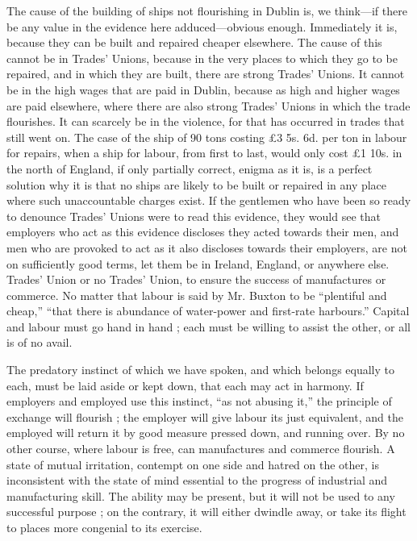 The cause of the building of ships not flourishing in Dublin is, we
think---if there be any value in the evidence here adduced---obvious
enough. Immediately it is, because they can be built and repaired
cheaper elsewhere. The cause of this cannot be in Trades' Unions,
because in the very places to which they go to be repaired, and in
which they are built, there are strong Trades' Unions. It cannot be in
the high wages that are paid in Dublin, because as high and higher wages
are paid elsewhere, where there are also strong Trades' Unions in which
the trade flourishes. It can scarcely be in the violence, for that has
occurred in trades that still went on. The case of the ship of 90 tons
costing £3 5s. 6d. per ton in labour for repairs, when a ship for
labour, from first to last, would only cost £1 10s. in the north of
England, if only partially correct, enigma as it is, is a perfect
solution why it is that no ships are likely to be built or repaired in
any place where such unaccountable charges exist. If the gentlemen who
have been so ready to denounce Trades' Unions were to read this
evidence, they would see that employers who act as this evidence
discloses they acted towards their men, and men who are provoked to act
as it also discloses towards their employers, are not on sufficiently
good terms, let them be in Ireland, England, or anywhere else. Trades'
Union or no Trades' Union, to ensure the success of manufactures or
commerce. No matter that labour is said by Mr. Buxton to be ``plentiful
and cheap,'' ``that there is abundance of water-power and first-rate
harbours.'' Capital and labour must go hand in hand ; each must be
willing to assist the other, or all is of no avail.

The predatory instinct of which we have spoken, and which belongs
equally to each, must be laid aside or kept down, that each may act in
harmony. If employers and employed use this instinct, ``as not abusing
it,'' the principle of exchange will flourish ; the employer will give
labour its just equivalent, and the employed will return it by good
measure pressed down, and running over. By no other course, where labour
is free, can manufactures and commerce flourish. A state of mutual
irritation, contempt on one side and hatred on the other, is
inconsistent with the state of mind essential to the progress of
industrial and manufacturing skill. The ability may be present, but it
will not be used to any successful purpose ; on the contrary, it will
either dwindle away, or take its flight to places more congenial to its
exercise.

